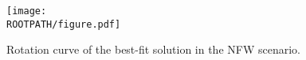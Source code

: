 \begin{figure}%
	\centering%
	\texttt{[image: \\ROOTPATH/figure.pdf]}
	\caption{Rotation curve of the best-fit solution in the NFW scenario.}%
	\label{fig:nfw:vrot}%
\end{figure}